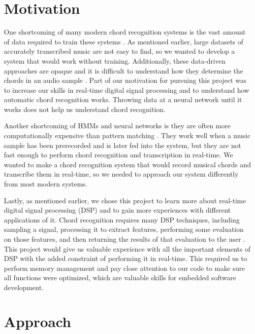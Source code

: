 \documentclass[journal]{IEEEtran}
\begin{document}
\section{Motivation}
One shortcoming of many modern chord recognition systems is the vast amount of data required to train these systems \cite{pauwels}.
As mentioned earlier, large datasets of accurately transcribed music are not easy to find, so we wanted to develop a system that would work without training.
Additionally, these data-driven approaches are opaque and it is difficult to understand how they determine the chords in an audio sample \cite{pauwels}.
Part of our motivation for pursuing this project was to increase our skills in real-time digital signal processing and to understand how automatic chord recognition works.
Throwing data at a neural network until it works does not help us understand chord recognition.

Another shortcoming of HMMs and neural networks is they are often more computationally expensive than pattern matching \cite{stark}.
They work well when a music sample has been prerecorded and is later fed into the system, but they are not fast enough to perform chord recognition and transcription in real-time.
We wanted to make a chord recognition system that would record musical chords and transcribe them in real-time, so we needed to approach our system differently from most modern systems.

Lastly, as mentioned earlier, we chose this project to learn more about real-time digital signal processing (DSP) and to gain more experiences with different applications of it.
Chord recognition requires many DSP techniques, including sampling a signal, processing it to extract features, performing some evaluation on those features, and then returning the results of that evaluation to the user \cite{fujishima}.
This project would give us valuable experience with all the important elements of DSP with the added constraint of performing it in real-time.
This required us to perform memory management and pay close attention to our code to make sure all functions were optimized, which are valuable skills for embedded software development.


\section{Approach}
\end{document}
